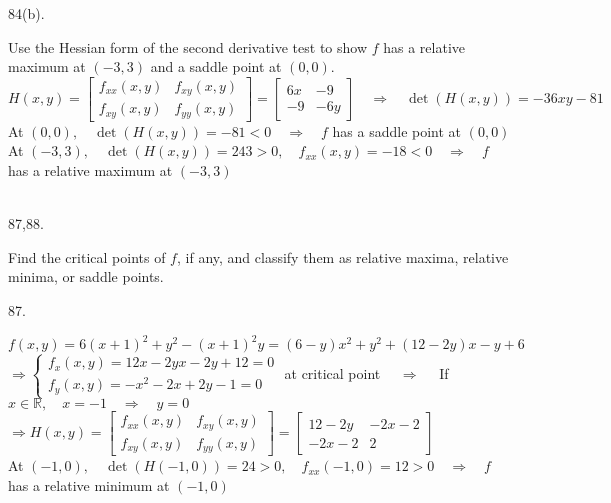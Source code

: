 \documentclass[12pt]{book}
\begin{document}
\begin{CJK}{UTF8}{bsmi}
84(b). \begin{minipage}[t]{\dimexpr\linewidth-2em}
Use the Hessian form of the second derivative test to show $f$ has a relative maximum at $(-3, 3)$ and a saddle point at $(0,0)$. \\
$H(x,y)=\begin{bmatrix}
f_{xx}(x, y) & f_{xy}(x, y) \\
f_{xy}(x, y) & f_{yy}(x, y)
\end{bmatrix}=\begin{bmatrix}
6x & -9 \\
-9 & -6y
\end{bmatrix}\quad\Rightarrow\quad\det(H(x, y))=-36xy-81$ \\
At $(0, 0),\quad\det(H(x, y))=-81<0\quad\Rightarrow\quad f$ has a saddle point at $(0, 0)$ \\
At $(-3, 3),\quad\det(H(x, y))=243>0,\quad f_{xx}(x, y)=-18<0\quad\Rightarrow\quad f$ has a relative maximum at $(-3, 3)$
\end{minipage}\\

87,88. \begin{minipage}[t]{\dimexpr\linewidth-2em}
Find the critical points of $f$, if any, and classify them as relative maxima, relative minima, or saddle points.
\end{minipage}

87. \begin{minipage}[t]{\dimexpr\linewidth-2em}
$f(x, y)=6(x+1)^2+y^2-(x+1)^2y=(6-y)x^2+y^2+(12-2y)x-y+6$ \\
$\Rightarrow\left\{\begin{matrix}
f_x(x, y) = 12x-2yx-2y+12 = 0 \\
f_y(x, y) = -x^2-2x+2y-1  = 0
\end{matrix}\right.$ at critical point $\quad\Rightarrow\quad$ If $x\in\mathbb{R},\quad x=-1\quad\Rightarrow\quad y=0$\\
$\Rightarrow H(x,y)=\begin{bmatrix}
f_{xx}(x, y) & f_{xy}(x, y) \\
f_{xy}(x, y) & f_{yy}(x, y)
\end{bmatrix}=\begin{bmatrix}
12-2y & -2x-2 \\
-2x-2 & 2
\end{bmatrix}$ \\
At $(-1, 0),\quad\det(H(-1, 0))=24>0,\quad f_{xx}(-1, 0)=12>0\quad\Rightarrow\quad f$ has a relative minimum at $(-1, 0)$
\end{minipage}\\


\end{CJK}
\end{document}
